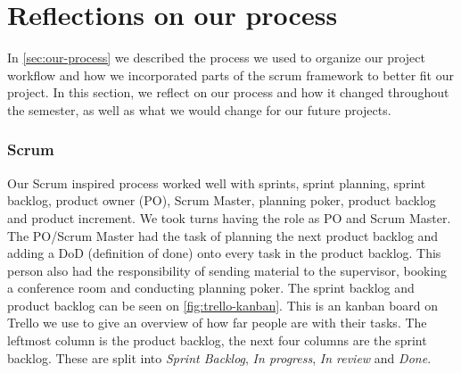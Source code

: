 \section{Reflections on our process}
In \autoref{sec:our-process} we described the process we used to organize our project workflow and how we incorporated parts of the scrum framework to better fit our project.
In this section, we reflect on our process and how it changed throughout the semester, as well as what we would change for our future projects.

\subsubsection{Scrum}
Our Scrum inspired process worked well with sprints, sprint planning, sprint backlog, product owner (PO), Scrum Master, planning poker, product backlog and product increment.
We took turns having the role as PO and Scrum Master.
The PO/Scrum Master had the task of planning the next product backlog and adding a DoD (definition of done) onto every task in the product backlog.
This person also had the responsibility of sending material to the supervisor, booking a conference room and conducting planning poker.
The sprint backlog and product backlog can be seen on \autoref{fig:trello-kanban}. 
This is an kanban board on Trello we use to give an overview of how far people are with their tasks.
The leftmost column is the product backlog, the next four columns are the sprint backlog.
These are split into \textit{Sprint Backlog}, \textit{In progress}, \textit{In review} and \textit{Done}.

